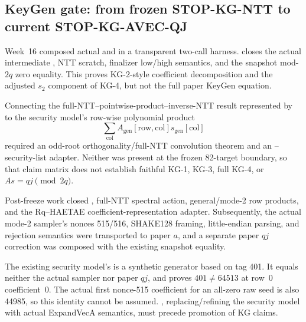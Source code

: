 \subsection{KeyGen gate: from frozen STOP-KG-NTT to current STOP-KG-AVEC-QJ}

Week~16 composed actual  and
 in a transparent two-call harness.
 closes the actual
intermediate , NTT scratch, finalizer low/high semantics, and
the snapshot mod-\(2q\) zero equality. This proves KG-2-style coefficient
decomposition and the adjusted \(s_2\) component of KG-4, but not the full paper
KeyGen equation.

\begin{boundary}
Connecting the full-NTT--pointwise-product--inverse-NTT result represented by
 to the security model's row-wise
polynomial product
\[
  \sum_{\mathrm{col}}
  A_{\mathrm{gen}}[\mathrm{row},\mathrm{col}]
  s_{\mathrm{gen}}[\mathrm{col}]
\]
required an odd-root orthogonality/full-NTT convolution theorem and an
--security-list adapter. Neither was present at the frozen
82-target boundary, so that claim matrix does not establish faithful KG-1, KG-3,
full KG-4, or \(As=qj\pmod{2q}\).
\end{boundary}

Post-freeze work closed , full-NTT spectral
action, general/mode-2 row products, and the Rq--HAETAE coefficient-representation
adapter. Subsequently, the actual mode-2 sampler's nonces 515/516, SHAKE128 framing,
little-endian parsing, and rejection semantics were transported to paper \(a\),
and a separate paper \(qj\) correction was composed with the existing snapshot equality.

\begin{boundary}
The existing security model's  is a
synthetic generator based on tag 401. It equals neither the actual sampler nor
paper \(qj\), and  proves
\(401\ne64513\) at row~0 coefficient~0. The actual first nonce-515 coefficient
for an all-zero raw seed is also 44985, so this identity cannot be assumed.
, replacing/refining the security model
with actual ExpandVecA semantics, must precede promotion of KG claims.
\end{boundary}

